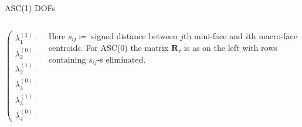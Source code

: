 \documentclass[svgnames]{beamer} %
\newcommand{\vect}[1]{\boldsymbol{\mathbf{#1}}}
\newcommand{\mmesh}{{\vect{\mathcal \tau}}}
\begin{document}
\begin{frame}{ASC(1) DOFs}
\begin{columns}
\begin{column}{.5\textwidth}
\begin{equation*}
{\begin{pmatrix}
						\lambda^{(1)}_1(T) \\
						\lambda^{(0)}_2(T) \\
						\lambda^{(1)}_2(T) \\
						\lambda^{(0)}_3(T) \\
						\lambda^{(1)}_3(T) \\
						\lambda^{(0)}_4(T)
					\end{pmatrix}}_{\vect \lambda_T =}
				\end{equation*}
				\endgroup
			\end{column}
			\begin{column}{.5\textwidth}
				Here $s_{ij} \coloneqq$ signed distance between $j$th mini-face and $i$th macro-face centroids. 
				For ASC(0) the matrix $\vect R_\mmesh$  is as on the left with rows containing $s_{ij}$-s eliminated.
			\end{column}
		\end{columns}
	\end{frame}
\end{document}
